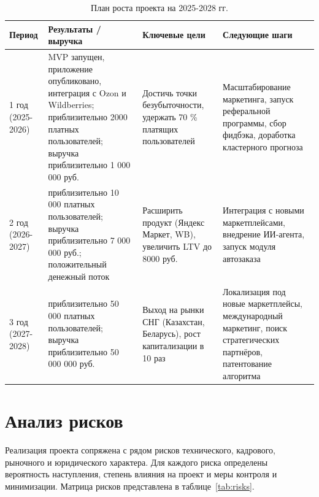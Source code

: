 \begin{table}[H]
\caption{План роста проекта на 2025-2028 гг.}
\label{tab:growthPlan}
\begin{center}
\small
\vspace{-0.5cm}\begin{tabular}{|p{2.5cm}|p{4cm}|p{4cm}|p{4cm}|}
\hline
Период & Результаты / выручка & Ключевые цели & Следующие шаги \\ \hline
1 год (2025-2026) & MVP запущен, приложение опубликовано, интеграция с Ozon и Wildberries; приблизительно 2000 платных пользователей; выручка приблизительно 1 000 000 руб. & Достичь точки безубыточности, удержать 70 \% платящих пользователей & Масштабирование маркетинга, запуск реферальной программы, сбор фидбэка, доработка кластерного прогноза \\ \hline
2 год (2026-2027) & приблизительно 10 000 платных пользователей; выручка приблизительно 7 000 000 руб.; положительный денежный поток & Расширить продукт (Яндекс Маркет, WB), увеличить LTV до 8000 руб. & Интеграция с новыми маркетплейсами, внедрение ИИ-агента, запуск модуля автозаказа \\ \hline
3 год (2027-2028) & приблизительно 50 000 платных пользователей; выручка приблизительно 50 000 000 руб. & Выход на рынки СНГ (Казахстан, Беларусь), рост капитализации в 10 раз & Локализация под новые маркетплейсы, международный маркетинг, поиск стратегических партнёров, патентование алгоритма \\ \hline
\end{tabular}
\end{center}
\end{table}

\section{Анализ рисков}

Реализация проекта сопряжена с рядом рисков технического, кадрового, рыночного и юридического характера. Для каждого риска определены вероятность наступления, степень влияния на проект и меры контроля и минимизации. Матрица рисков представлена в таблице~\ref{tab:risks}.

